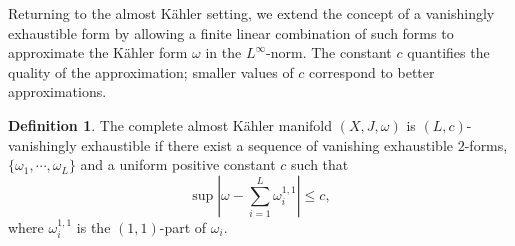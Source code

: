 \documentclass[12pt, twoside]{article}
\theoremstyle{definition}
\newtheorem{definition}[theorem]{Definition}
\numberwithin{equation}{section}
\def\w {\omega}
\begin{document}
	Returning to the almost Kähler setting, we extend the concept of a vanishingly exhaustible form by allowing a finite linear combination of such forms to approximate the Kähler form $\w$ in the $L^{\infty}$-norm. The constant $c$ quantifies the quality of the approximation; smaller values of $c$ correspond to better approximations.
	\begin{definition}\label{D1}
		The complete almost K\"{a}hler manifold $(X,J,\w)$ is $(L,c)$-vanishingly exhaustible if there exist a sequence of vanishing  exhaustible $2$-forms, $\{\w_{1},\cdots,\w_{L}\}$ and a uniform positive constant $c$ such that
		\begin{equation*}
		\sup|\w-\sum_{i=1}^{L}\w_{i}^{1,1}|\leq c,
		\end{equation*}
		where $\w_{i}^{1,1}$ is the $(1,1)$-part of $\w_{i}$.
	\end{definition}
\end{document}

